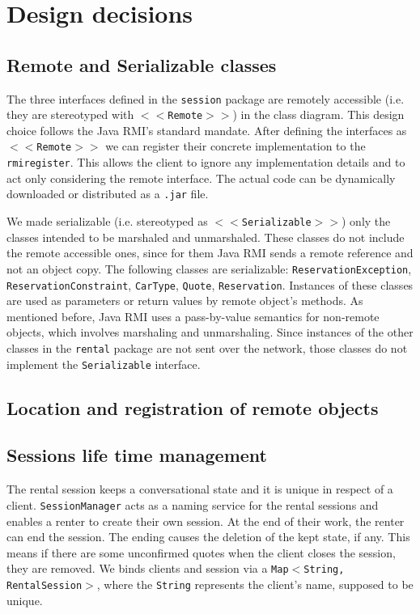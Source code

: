 \section{Design decisions}
\subsection{Remote and Serializable classes}
The three interfaces defined in the \texttt{session} package are remotely accessible (i.e. they are stereotyped with \texttt{$<<$Remote$>>$}) in the class diagram. This design choice follows the Java RMI's standard mandate. After defining the interfaces as \texttt{$<<$Remote$>>$} we can register their concrete implementation to the \texttt{rmiregister}. This allows the client to ignore any implementation details and to act only considering the remote interface. The actual code can be dynamically downloaded or distributed as a \texttt{.jar} file.

We made serializable (i.e. stereotyped as \texttt{$<<$Serializable$>>$}) only the classes intended to be marshaled and unmarshaled. These classes do not include the remote accessible ones, since for them Java RMI sends a remote reference and not an object copy. The following classes are serializable: \texttt{ReservationException}, \texttt{ReservationConstraint}, \texttt{CarType}, \texttt{Quote}, \texttt{Reservation}. Instances of these classes are used as parameters or return values by remote object's methods. As mentioned before, Java RMI uses a pass-by-value semantics for non-remote objects, which involves marshaling and unmarshaling. Since instances of the other classes in the \texttt{rental} package are not sent over the network, those classes do not implement the \texttt{Serializable} interface. 

\subsection{Location and registration of remote objects}

\subsection{Sessions life time management}
The rental session keeps a conversational state and it is unique in respect of a client. \texttt{SessionManager} acts as a naming service for the rental sessions and enables a renter to create their own session. At the end of their work, the renter can end the session. The ending causes the deletion of the kept state, if any. This means if there are some unconfirmed quotes when the client closes the session, they are removed. We binds clients and session via a \texttt{Map$<$String, RentalSession$>$}, where the \texttt{String} represents the client's name, supposed to be unique.

